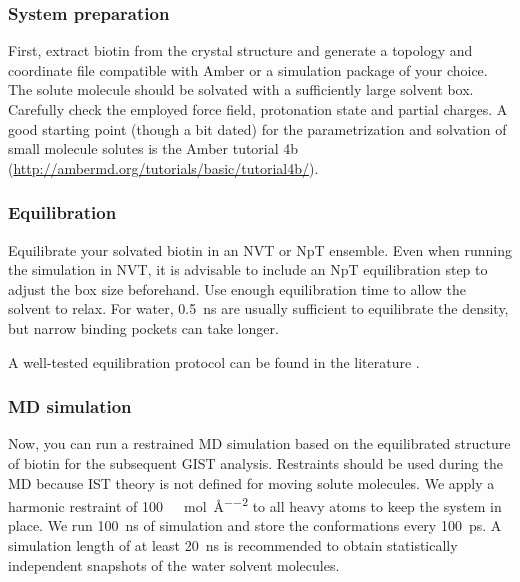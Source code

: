 \documentclass[9pt,tutorial]{livecoms}
\begin{document}
\subsubsection{System preparation}
First, extract biotin from the crystal structure and generate a topology and coordinate file compatible with Amber or a simulation package of your choice.
The solute molecule should be solvated with a sufficiently large solvent box.
Carefully check the employed force field, protonation state and partial charges.
A good starting point (though a bit dated) for the parametrization and solvation of small molecule solutes is the Amber tutorial 4b (\url{http://ambermd.org/tutorials/basic/tutorial4b/}).

\subsubsection{Equilibration}
Equilibrate your solvated biotin in an NVT or NpT ensemble.
Even when running the simulation in NVT, it is advisable to include an NpT equilibration step to adjust the box size beforehand.
Use enough equilibration time to allow the solvent to relax. 
For water, \SI{0.5}{\nano\second} are usually sufficient to equilibrate the density, but narrow binding pockets can take longer.

A well-tested equilibration protocol can be found in the literature \cite{Roe2020-equilibration}.

\subsubsection{MD simulation}

Now, you can run a restrained MD simulation based on the equilibrated structure of biotin for the subsequent GIST analysis.
Restraints should be used during the MD because IST theory is not defined for moving solute molecules.
We apply a harmonic restraint of \SI{100}{\kilo\calorie\per\mole\per\angstrom\squared} to all heavy atoms to keep the system in place.
We run \SI{100}{\nano\second} of simulation and store the conformations every \SI{100}{\pico\second}.
A simulation length of at least \SI{20}{\nano\second} is recommended to obtain statistically independent snapshots of the water solvent molecules. 
\end{document}
